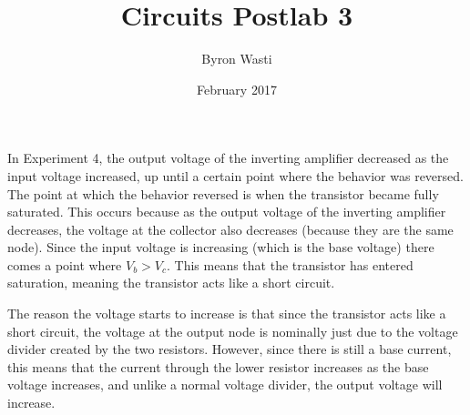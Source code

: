 \documentclass{article}
\title{Circuits Postlab 3}
\author{Byron Wasti}
\date{February 2017}
\begin{document}
\maketitle

In Experiment 4, the output voltage of the inverting amplifier decreased as the input voltage increased, up until a certain point where the behavior was reversed. The point at which the behavior reversed is when the transistor became fully saturated. This occurs because as the output voltage of the inverting amplifier decreases, the voltage at the collector also decreases (because they are the same node). Since the input voltage is increasing (which is the base voltage) there comes a point where $V_b > V_c$. This means that the transistor has entered saturation, meaning the transistor acts like a short circuit. 

The reason the voltage starts to increase is that since the transistor acts like a short circuit, the voltage at the output node is nominally just due to the voltage divider created by the two resistors. However, since there is still a base current, this means that the current through the lower resistor increases as the base voltage increases, and unlike a normal voltage divider, the output voltage will increase.
\end{document}
